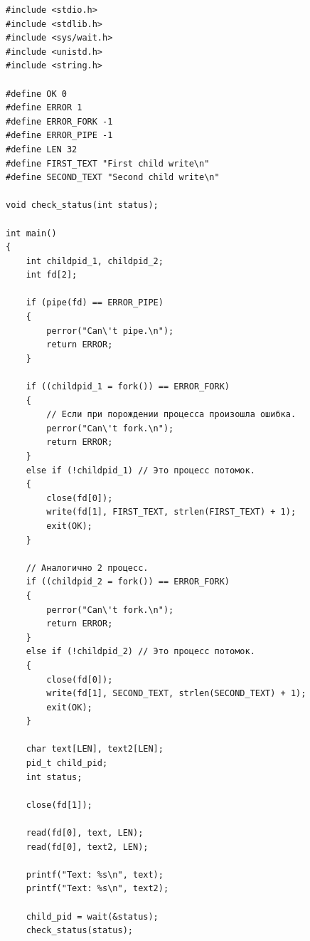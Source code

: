 \begin{figure}[ht!]
\end{figure}

\clearpage

\begin{lstlisting}[label=some-code,caption=Программа 4.]
#include <stdio.h>
#include <stdlib.h>
#include <sys/wait.h>
#include <unistd.h>
#include <string.h>

#define OK 0
#define ERROR 1
#define ERROR_FORK -1
#define ERROR_PIPE -1
#define LEN 32
#define FIRST_TEXT "First child write\n"
#define SECOND_TEXT "Second child write\n"

void check_status(int status);

int main()
{
	int childpid_1, childpid_2;
	int fd[2];

	if (pipe(fd) == ERROR_PIPE)
	{
		perror("Can\'t pipe.\n");
		return ERROR;
	}

	if ((childpid_1 = fork()) == ERROR_FORK)
	{
		// Если при порождении процесса произошла ошибка.
		perror("Can\'t fork.\n");
		return ERROR;
	}
	else if (!childpid_1) // Это процесс потомок.
	{
		close(fd[0]);
		write(fd[1], FIRST_TEXT, strlen(FIRST_TEXT) + 1);
		exit(OK);
	}

	// Аналогично 2 процесс.
	if ((childpid_2 = fork()) == ERROR_FORK)
	{
		perror("Can\'t fork.\n");
		return ERROR;
	}
	else if (!childpid_2) // Это процесс потомок.
	{
		close(fd[0]);
		write(fd[1], SECOND_TEXT, strlen(SECOND_TEXT) + 1);
		exit(OK);
	}

	char text[LEN], text2[LEN];
	pid_t child_pid;
	int status;

	close(fd[1]);

	read(fd[0], text, LEN);
	read(fd[0], text2, LEN);

	printf("Text: %s\n", text);
	printf("Text: %s\n", text2);

	child_pid = wait(&status);
	check_status(status);


\end{lstlisting}
